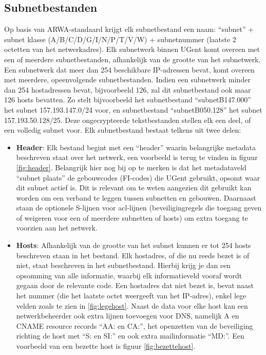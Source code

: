\subsection{Subnetbestanden}
\label{subnetbestanden}
Op basis van ARWA-standaard krijgt elk subnetbestand een naam: “subnet” + subnet klasse (A/B/C/D/G/I/N/P/T/V/W) + subnetnummer (laatste 2 octetten van het netwerkadres). Elk subnetwerk binnen UGent komt overeen met een of meerdere subnetbestanden, afhankelijk van de grootte van het subnetwerk. Een subnetwerk dat meer dan 254 beschikbare IP-adressen bevat, komt overeen met meerdere, opeenvolgende subnetbestanden. Indien een subnetwerk minder dan 254 hostadressen bevat, bijvoorbeeld 126, zal dit subnetbestand ook maar 126 hosts bevatten.
Zo stelt bijvoorbeeld het subnetbestand “subnetB147.000” het subnet 157.193.147.0/24 voor, en subnetbestand “subnetB050.128” het subnet 157.193.50.128/25. Deze ongecrypteerde tekstbestanden stellen elk een deel, of een volledig subnet voor. Elk subnetbestand bestaat telkens uit twee delen: 
\begin{itemize}
    \item \textbf{Header}: Elk bestand begint met een “header” waarin belangrijke metadata beschreven staat over het netwerk, een voorbeeld is terug te vinden in figuur \ref{fig:header}. Belangrijk hier nog bij op te merken is dat het metadataveld “subnet plaats” de gebouwcodes (FI-codes) die UGent gebruikt, opsomt waar dit subnet actief is. Dit is relevant om te weten aangezien dit gebruikt kan worden om een verband te leggen tussen subnetten en gebouwen. Daarnaast staan de optionele S-lijnen voor \acrfull{acl}-lijnen (beveiligingregels die toegang geven of weigeren voor een of meerdere subnetten of hosts) om extra toegang te voorzien aan het netwerk. 
    \item \textbf{Hosts}: Afhankelijk van de grootte van het subnet kunnen er tot 254 hosts beschreven staan in het bestand. Elk hostadres, of die nu reeds bezet is of niet, staat beschreven in het subnetbestand. Hierbij krijg je dan een opsomming van alle informatie, waarbij elk informatieveld vooraf wordt gegaan door de relevante code. Een hostadres dat niet bezet is, bevat naast het nummer (die het laatste octet weergeeft van het IP-adres), enkel lege velden zoals te zien in \ref{fig:legehost}. Naast de data voor elke host kan een netwerkbeheerder ook extra lijnen toevoegen voor DNS, namelijk A en CNAME resource records “AA: en CA:”, het openzetten van de beveiliging richting de host met “S: en SI:” en ook extra mailinformatie “MD:”. Een voorbeeld van een bezette host is figuur \ref{fig:bezettehost}.
\end{itemize}


